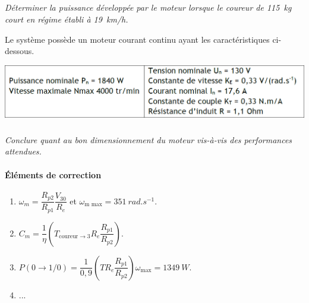 \documentclass[10pt,fleqn]{article} %
\begin{document}
\begin{multicols}{2}
\subparagraph{}
\textit{Déterminer la puissance développée par le moteur lorsque le coureur de \SI{115}{kg} court en régime
établi à \SI{19}{km/h}.}
\ifprof
\begin{corrige}
\end{corrige}\else\fi
Le système possède
un moteur courant
continu ayant les
caractéristiques ci-dessous.

\begin{center}
\includegraphics[width=\linewidth]{images/fig_03.png}
\end{center}

\subparagraph{}
\textit{Conclure quant au bon dimensionnement du moteur vis-à-vis des performances attendues.}
\ifprof
\begin{corrige}
\end{corrige}\else\fi

\vspace{1cm}
\footnotesize
\paragraph*{Éléments de correction}
\begin{enumerate}
\item $\omega_m=\dfrac{R_{p2}}{R_{p1}}\dfrac{V_{30}}{R_e}$ et $\omega_{\text{m max}}=\SI{351}{rad.s^{-1}}$.
\item $C_m=\dfrac{1}{\eta}\left( T_{\text{coureur}\rightarrow 3} R_e \dfrac{R_{p1}}{R_{p2}}\right)$.
\item $P\left(0\to1/0 \right)=\dfrac{1}{0,9}\left(T R_e \dfrac{R_{p1}}{R_{p2}} \right) \omega_{\text{max}}=\SI{1349}{W}$.
\item ...
\end{enumerate}


\ifprof
\else
\end{multicols}
\fi
\end{document}
